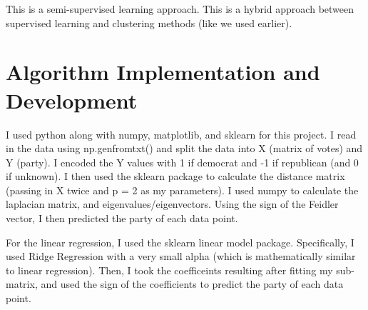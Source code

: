 \documentclass[11pt]{amsart}
\begin{document}
This is a semi-supervised learning approach. This is a hybrid approach between 
supervised learning and clustering methods (like we used earlier). 

\section{Algorithm Implementation and Development}\label{sec:algorithms}
I used python along with numpy, matplotlib, and sklearn for this project. I read in the data 
using np.genfromtxt() and split the data into X (matrix of votes) and Y (party). I encoded the Y 
values with 1 if democrat and -1 if republican (and 0 if unknown). 
I then used the sklearn package to calculate the distance matrix (passing in X twice and p = 2 as my parameters). 
I used numpy to calculate the laplacian matrix, and eigenvalues/eigenvectors. Using the sign of the Feidler 
vector, I then predicted the party of each data point. 

For the linear regression, I used the sklearn linear model package. Specifically, I used 
Ridge Regression with a very small alpha (which is mathematically similar to linear regression).
Then, I took the coefficeints resulting after fitting my sub-matrix, and used the sign of the
coefficients to predict the party of each data point.

\end{document}
